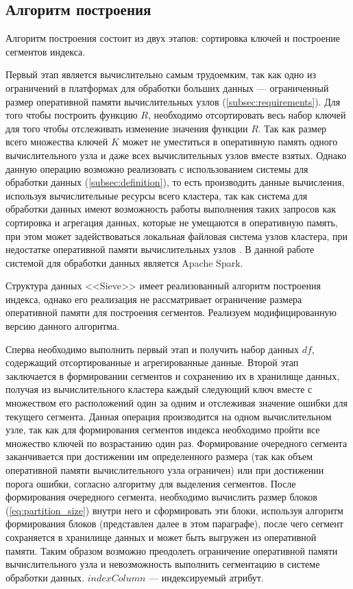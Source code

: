 \subsection{Алгоритм построения}\label{build}

Алгоритм построения состоит из двух этапов: сортировка ключей и построение сегментов индекса.

Первый этап является вычислительно самым трудоемким, так как одно из ограничений в платформах для обработки больших данных --- ограниченный размер оперативной памяти вычислительных узлов (\ref{subsec:requirements}). Для того чтобы построить функцию $R$, необходимо отсортировать весь набор ключей для того чтобы отслеживать изменение значения функции $R$. Так как размер всего множества ключей $K$ может не уместиться в оперативную память одного вычислительного узла и даже всех вычислительных узлов вместе взятых. Однако данную операцию возможно реализовать с использованием системы для обработки данных (\ref{subsec:definition}), то есть производить данные вычисления, используя вычислительные ресурсы всего кластера, так как система для обработки данных имеют возможность работы выполнения таких запросов как сортировка и агрегация данных, которые не умещаются в оперативную память, при этом может задействоваться локальная файловая система узлов кластера, при недостатке оперативной памяти вычислительных узлов \cite{Impact_of_memory_size_on_bigdata}. В данной работе системой для обработки данных является Apache Spark.

Структура данных {<<Sieve>>} имеет реализованный алгоритм построения индекса, однако его реализация не рассматривает ограничение размера оперативной памяти для построения сегментов. Реализуем модифицированную версию данного алгоритма.

Сперва необходимо выполнить первый этап и получить набор данных $df$, содержащий отсортированные и агрегированные данные. Второй этап заключается в формировании сегментов и сохранению их в хранилище данных, получая из вычислительного кластера каждый следующий ключ вместе с множеством его расположений один за одним и отслеживая значение ошибки для текущего сегмента. Данная операция производится на одном вычислительном узле, так как для формирования сегментов индекса необходимо пройти все множество ключей по возрастанию один раз. Формирование очередного сегмента заканчивается при достижении им определенного размера (так как объем оперативной памяти вычислительного узла ограничен) или при достижении порога ошибки, согласно алгоритму для выделения сегментов. После формирования очередного сегмента, необходимо вычислить размер блоков (\ref{eq:partition_size}) внутри него и сформировать эти блоки, используя алгоритм формирования блоков (представлен далее в этом параграфе), после чего сегмент сохраняется в хранилище данных и может быть выгружен из оперативной памяти. Таким образом возможно преодолеть ограничение оперативной памяти вычислительного узла и невозможность выполнить сегментацию в системе обработки данных. $indexColumn$ --- индексируемый атрибут.

